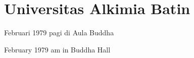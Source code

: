 \chapter{Universitas Alkimia Batin} %

 Februari 1979 pagi di Aula Buddha

 February 1979 am in Buddha Hall
